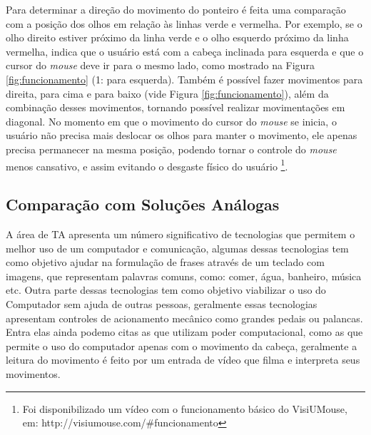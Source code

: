 Para determinar a direção do movimento do ponteiro é feita uma comparação com a posição dos olhos em relação às linhas verde e vermelha. Por exemplo, se o olho direito estiver próximo da linha verde e o olho esquerdo próximo da linha vermelha, indica que o usuário está com a cabeça inclinada para esquerda e que o cursor do \textit{mouse} deve ir para o mesmo lado, como mostrado na Figura \ref{fig:funcionamento} (1: para esquerda). Também é possível fazer movimentos para direita, para cima e para baixo (vide Figura \ref{fig:funcionamento}), além da combinação desses movimentos, tornando possível realizar movimentações em diagonal. No momento em que o movimento do cursor do \textit{mouse} se inicia, o usuário não precisa mais deslocar os olhos para manter o movimento, ele apenas precisa permanecer na mesma posição, podendo tornar o controle do \textit{mouse} menos cansativo, e assim evitando o desgaste físico do usuário \footnote{Foi disponibilizado um vídeo com o funcionamento básico do VisiUMouse, em: http://visiumouse.com/\#funcionamento}. 




\subsection{Comparação com Soluções Análogas}\label{Sub:tabela-comparativa}
% 
% 
A área de TA apresenta um número significativo de tecnologias que permitem o melhor uso de um computador e comunicação, algumas dessas tecnologias tem como objetivo ajudar na formulação de frases através de um teclado com imagens, que representam palavras comuns, como: comer, água, banheiro, música etc. Outra parte dessas tecnologias tem como objetivo viabilizar o uso do Computador sem ajuda de outras pessoas, geralmente essas tecnologias apresentam controles de acionamento mecânico como grandes pedais ou palancas. Entra elas ainda podemo citas as que utilizam poder computacional, como as que permite o uso do computador apenas com o movimento da cabeça, geralmente a leitura do movimento é feito por um  entrada de vídeo que filma e interpreta seus movimentos.


